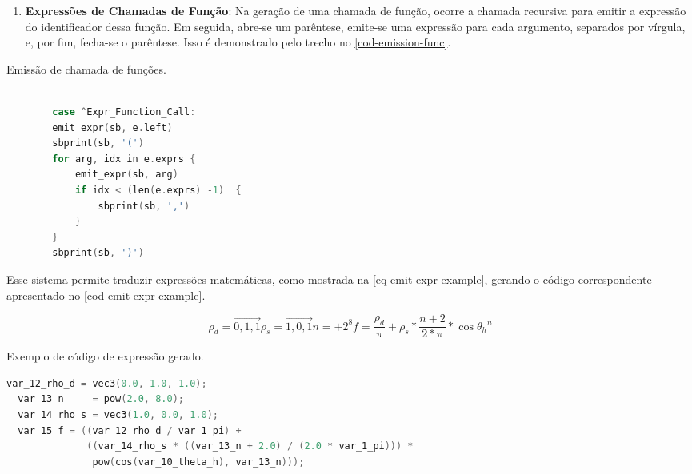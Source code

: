 \begin{enumerate}
    \item \textbf{Expressões de Chamadas de Função}:
       Na geração de uma chamada de função, ocorre a chamada recursiva para emitir a expressão do identificador dessa função. Em seguida, abre-se um parêntese, emite-se uma expressão para cada argumento, separados por vírgula, e, por fim, fecha-se o parêntese. Isso é demonstrado pelo trecho no \autoref{cod-emission-func}.

\end{enumerate}

\begin{codigo}[H]
    \caption{\small Emissão de chamada de funções. }
    \label{cod-emission-func}
\begin{lstlisting}[language=C, frame=none, inputencoding=utf8]

        case ^Expr_Function_Call:
        emit_expr(sb, e.left)
        sbprint(sb, '(')
        for arg, idx in e.exprs {
            emit_expr(sb, arg)
            if idx < (len(e.exprs) -1)  {
                sbprint(sb, ',')
            }
        }
        sbprint(sb, ')')
\end{lstlisting}
\end{codigo}


 Esse sistema permite traduzir expressões matemáticas, como mostrada na \autoref{eq-emit-expr-example}, gerando o código correspondente apresentado no \autoref{cod-emit-expr-example}.

\begin{subequations} \label{eq-emit-expr-example}
\begin{equation}
    \rho_{d} = \vec{0,1,1}
\end{equation}
\begin{equation}
    \rho_{s} = \vec{1,0,1}
\end{equation}
\begin{equation}
    n = +2^8
\end{equation}
\begin{equation}
f = \frac{\rho_{d}}{\pi} + \rho_{s} * \frac{n+2}{2*\pi} *
\cos{\theta_{h}}^{n}
\end{equation}
\end{subequations}

\begin{codigo}[H]
   \caption{\small Exemplo de código de expressão gerado. }
   \label{cod-emit-expr-example}
\begin{lstlisting}[language=C, basicstyle=\ttfamily\footnotesize, frame=none, inputencoding=utf8]
  var_12_rho_d = vec3(0.0, 1.0, 1.0);
  var_13_n     = pow(2.0, 8.0);
  var_14_rho_s = vec3(1.0, 0.0, 1.0);
  var_15_f = ((var_12_rho_d / var_1_pi) +
              ((var_14_rho_s * ((var_13_n + 2.0) / (2.0 * var_1_pi))) *
               pow(cos(var_10_theta_h), var_13_n)));
\end{lstlisting}
\end{codigo}

